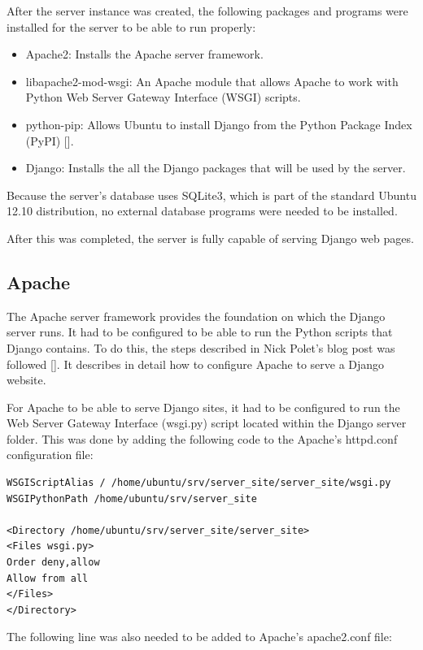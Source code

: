 After the server instance was created, the following
packages and programs were installed for the server to be able to run properly:

\begin{itemize}
  \item Apache2: Installs the Apache server framework.
  \item libapache2-mod-wsgi: An Apache module that allows Apache to work with
  Python Web Server Gateway Interface (WSGI) scripts.
  \item python-pip: Allows Ubuntu to install Django from the Python Package Index (PyPI)
  [\cite{website:pypi}].
  \item Django: Installs the all the Django packages that will be used by the server. 
\end{itemize}

Because the server's database uses SQLite3, which is part of the standard Ubuntu
12.10 distribution, no external database programs were needed to be installed.

After this was completed, the server is fully capable of serving Django web
pages.

\subsection{Apache}

The Apache server framework provides the foundation on which the Django server runs. It had to
be configured to be able to run the Python scripts that Django contains. To do this, the steps
described in Nick Polet's blog post was followed [\cite{article:apache-setup}]. It describes
in detail how to configure Apache to serve a Django website.

For Apache to be able to serve Django sites, it had to be configured to run the Web Server
Gateway Interface (wsgi.py) script located within the Django server folder. This was done by
adding the following code to the Apache's httpd.conf configuration file:

\begin{verbatim}
WSGIScriptAlias / /home/ubuntu/srv/server_site/server_site/wsgi.py
WSGIPythonPath /home/ubuntu/srv/server_site

<Directory /home/ubuntu/srv/server_site/server_site>
<Files wsgi.py>
Order deny,allow
Allow from all
</Files>
</Directory>
\end{verbatim}

The following line was also needed to be added to Apache's apache2.conf file:

